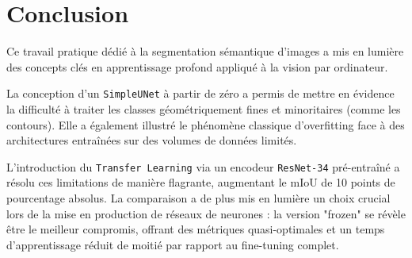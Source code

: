 \documentclass[12pt, a4paper]{article}
\begin{document}
\newpage
\section{Conclusion}
Ce travail pratique dédié à la segmentation sémantique d'images a mis en lumière des concepts clés en apprentissage profond appliqué à la vision par ordinateur. 

La conception d'un \texttt{SimpleUNet} à partir de zéro a permis de mettre en évidence la difficulté à traiter les classes géométriquement fines et minoritaires (comme les contours). Elle a également illustré le phénomène classique d'overfitting face à des architectures entraînées sur des volumes de données limités. 

L'introduction du \texttt{Transfer Learning} via un encodeur \texttt{ResNet-34} pré-entraîné a résolu ces limitations de manière flagrante, augmentant le mIoU de 10 points de pourcentage absolus. La comparaison a de plus mis en lumière un choix crucial lors de la mise en production de réseaux de neurones : la version "frozen" se révèle être le meilleur compromis, offrant des métriques quasi-optimales et un temps d'apprentissage réduit de moitié par rapport au fine-tuning complet.
\end{document}
